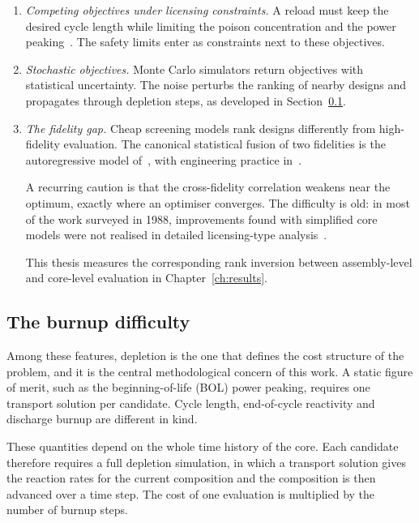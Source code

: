\begin{enumerate}
  \item \emph{Competing objectives under licensing constraints.} A reload
        must keep the desired cycle length while limiting the poison
        concentration and the power peaking~\cite{stewart_2021}. The
        safety limits enter as constraints next to these objectives.

  \item \emph{Stochastic objectives.} Monte Carlo simulators return
        objectives with statistical uncertainty. The noise perturbs the
        ranking of nearby designs and propagates through depletion
        steps, as developed in Section~\ref{sec:lit-opt-burnup}.

  \item \emph{The fidelity gap.} Cheap screening models rank designs
        differently from high-fidelity evaluation. The canonical
        statistical fusion of two fidelities is the autoregressive model
        of~\cite{kennedy_ohagan_2000}, with engineering practice
        in~\cite{forrester_book_2008}.

        A recurring caution is that the cross-fidelity correlation
        weakens near the optimum, exactly where an optimiser converges.
        The difficulty is old: in most of the work surveyed in 1988,
        improvements found with simplified core models were not realised
        in detailed licensing-type analysis~\cite{downar_1988}.

        This thesis measures the corresponding rank inversion between
        assembly-level and core-level evaluation in
        Chapter~\ref{ch:results}.
\end{enumerate}

\subsection{The burnup difficulty}
\label{sec:lit-opt-burnup}

Among these features, depletion is the one that defines the cost
structure of the problem, and it is the central methodological concern
of this work. A static figure of merit, such as the beginning-of-life
(BOL) power peaking, requires one transport solution per candidate.
Cycle length, end-of-cycle reactivity and discharge burnup are different
in kind.

These quantities depend on the whole time history of the core. Each
candidate therefore requires a full depletion simulation, in which a
transport solution gives the reaction rates for the current composition
and the composition is then advanced over a time step. The cost of one
evaluation is multiplied by the number of burnup steps.

